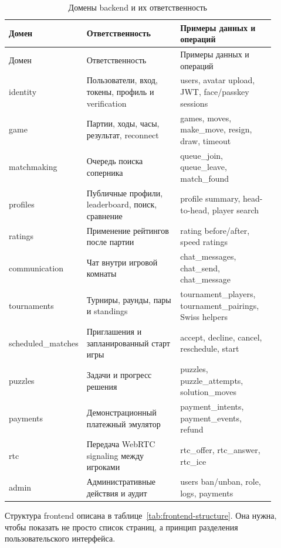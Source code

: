 \noindent\scriptsize
\setlength{\tabcolsep}{3pt}
\renewcommand{\arraystretch}{1.14}
\begin{longtable}{|>{\RaggedRight\arraybackslash}p{0.18\linewidth}|>{\RaggedRight\arraybackslash}p{0.36\linewidth}|>{\RaggedRight\arraybackslash}p{0.36\linewidth}|}
\caption{Домены backend и их ответственность}\label{tab:backend-domains}\\
\hline
Домен & Ответственность & Примеры данных и операций\\ \hline
\endfirsthead
\hline
Домен & Ответственность & Примеры данных и операций\\ \hline
\endhead
identity & Пользователи, вход, токены, профиль и verification & users, avatar upload, JWT, face/passkey sessions\\ \hline
game & Партии, ходы, часы, результат, reconnect & games, moves, make_move, resign, draw, timeout\\ \hline
matchmaking & Очередь поиска соперника & queue_join, queue_leave, match_found\\ \hline
profiles & Публичные профили, leaderboard, поиск, сравнение & profile summary, head-to-head, player search\\ \hline
ratings & Применение рейтингов после партии & rating before/after, speed ratings\\ \hline
communication & Чат внутри игровой комнаты & chat_messages, chat_send, chat_message\\ \hline
tournaments & Турниры, раунды, пары и standings & tournament_players, tournament_pairings, Swiss helpers\\ \hline
scheduled_matches & Приглашения и запланированный старт игры & accept, decline, cancel, reschedule, start\\ \hline
puzzles & Задачи и прогресс решения & puzzles, puzzle_attempts, solution_moves\\ \hline
payments & Демонстрационный платежный эмулятор & payment_intents, payment_events, refund\\ \hline
rtc & Передача WebRTC signaling между игроками & rtc_offer, rtc_answer, rtc_ice\\ \hline
admin & Административные действия и аудит & users ban/unban, role, logs, payments\\ \hline
\end{longtable}
\normalsize

Структура frontend описана в таблице~\ref{tab:frontend-structure}. Она нужна, чтобы показать не просто список страниц, а принцип разделения пользовательского интерфейса.

